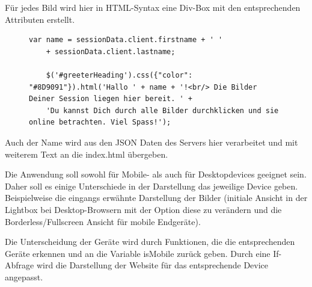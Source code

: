 Für jedes Bild wird hier in HTML-Syntax eine Div-Box mit den entsprechenden Attributen erstellt. 

\begin{figure}[h]
	\begin{lstlisting}[caption={Auszug aus app.js}, label=list_client]
	var name = sessionData.client.firstname + ' '
	+ sessionData.client.lastname;
	
	$('#greeterHeading').css({"color": "#8D9091"}).html('Hallo ' + name + '!<br/> Die Bilder Deiner Session liegen hier bereit. ' +
	'Du kannst Dich durch alle Bilder durchklicken und sie online betrachten. Viel Spass!');
	\end{lstlisting}
\end{figure}


Auch der Name wird aus den JSON Daten des Servers hier verarbeitet und mit weiterem Text an die index.html übergeben. 

Die Anwendung soll sowohl für Mobile- als auch für Desktopdevices geeignet sein. Daher soll es einige Unterschiede in der Darstellung das jeweilige Device geben. Beispielweise die eingangs erwähnte Darstellung der Bilder (initiale Ansicht in der Lightbox bei Desktop-Browsern mit der Option diese zu verändern und die Borderless/Fullscreen Ansicht für mobile Endgeräte). 

Die Unterscheidung der Geräte wird durch Funktionen, die die entsprechenden Geräte erkennen und an die Variable isMobile zurück geben. Durch eine If-Abfrage wird die Darstellung der Website für das entsprechende Device angepasst.

